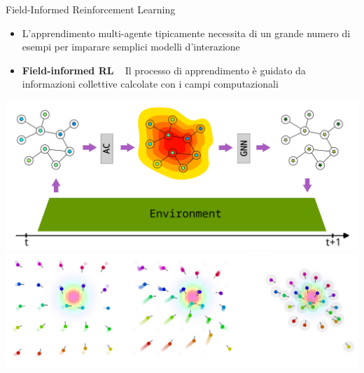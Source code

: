 \documentclass[presentation, 10pt,aspectratio=169]{beamer}\mode<presentation>{\usetheme{AMSBolognaFC}}
\begin{document}
\begin{frame}{Field-Informed Reinforcement Learning}

\begin{minipage}{0.35\textwidth}
	\begin{itemize}
		\item L'apprendimento multi-agente tipicamente necessita di un grande numero di esempi per imparare semplici modelli d'interazione
		\item \textbf{Field-informed RL} \faArrowRight ~ Il processo di apprendimento è guidato da informazioni collettive calcolate con i campi computazionali
	\end{itemize}
\end{minipage}
\hfill
\begin{minipage}{0.6\textwidth}
	\centering
	\includegraphics[width=\textwidth]{img/gnn.png}
	\includegraphics[width=\textwidth]{img/gnn-example.png}
\end{minipage}
\end{frame}
\end{document}
